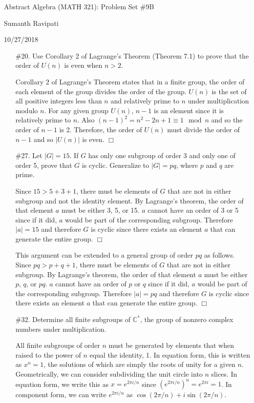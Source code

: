 \documentclass{article}
\newcommand{\C}{\mathbb C}
\begin{document}
%
\centerline{\Large Abstract Algebra (MATH 321): Problem Set \#9B}
\centerline{Sumanth Ravipati}
\centerline{10/27/2018}

\begin{enumerate}
    \item[\#20.] Use Corollary 2 of Lagrange's Theorem (Theorem 7.1) to prove that the order of $U(n)$ is even when $n > 2$.
    \begin{flushleft}
    Corollary 2 of Lagrange's Theorem states that in a finite group, the order of each element of the group divides the order of the group. $U(n)$ is the set of all positive integers less than $n$ and relatively prime to $n$ under multiplication modulo $n$. For any given group $U(n)$, $n-1$ is an element since it is relatively prime to $n$. Also $(n-1)^2 = n^2 -2n +1 \equiv 1 \mod n$ and so the order of $n-1$ is 2. Therefore, the order of $U(n)$ must divide the order of $n-1$ and so $|U(n)|$ is even. $\Box$
    \end{flushleft}
    
    \item[\#27.] Let $|G| = 15$. If $G$ has only one subgroup of order 3 and only one of order 5, prove that $G$ is cyclic. Generalize to $|G| = pq$, where $p$ and $q$ are prime.
    \begin{flushleft}
    Since $15 > 5 + 3 + 1$, there must be elements of $G$ that are not in either subgroup and not the identity element. By Lagrange's theorem, the order of that element $a$ must be either 3, 5, or 15. $a$ cannot have an order of 3 or 5 since if it did, $a$ would be part of the corresponding subgroup. Therefore $|a| = 15$ and therefore $G$ is cyclic since there exists an element $a$ that can generate the entire group. $\Box$\newline
    
    This argument can be extended to a general group of order $pq$ as follows. Since $pq > p + q + 1$, there must be elements of $G$ that are not in either subgroup. By Lagrange's theorem, the order of that element $a$ must be either $p$, $q$, or $pq$. $a$ cannot have an order of $p$ or $q$ since if it did, $a$ would be part of the corresponding subgroup. Therefore $|a| = pq$ and therefore $G$ is cyclic since there exists an element $a$ that can generate the entire group. $\Box$
    \end{flushleft}
    
    \item[\#32.] Determine all finite subgroups of $\C^*$, the group of nonzero complex numbers under multiplication.
    \begin{flushleft}
    All finite subgroups of order $n$ must be generated by elements that when raised to the power of $n$ equal the identity, 1. In equation form, this is written as $x^n = 1$, the solutions of which are simply the roots of unity for a given $n$. Geometrically, we can consider subdividing the unit circle into $n$ slices. In equation form, we write this as $x = e^{2\pi i/n}$ since $(e^{2\pi i/n})^n = e^{2\pi i} = 1$. In component form, we can write $e^{2\pi i/n}$ as $\cos(2\pi/n) + i \sin(2\pi/n)$.
    \end{flushleft}
    

\end{enumerate}
\end{document}
